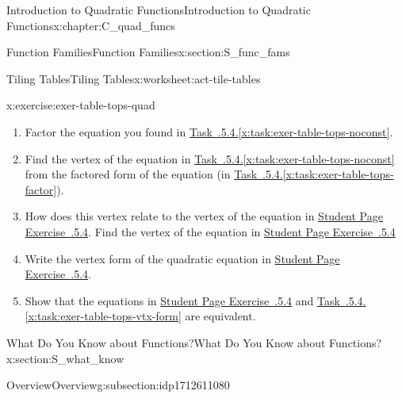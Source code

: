 \documentclass[oneside,10pt,]{book}
\newcommand{\xreffont}{\relax}
\numberwithin{equation}{chapter}
\begin{document}
\begin{chapterptx}{Introduction to Quadratic Functions}{}{Introduction to Quadratic Functions}{}{}{x:chapter:C_quad_funcs}
\begin{sectionptx}{Function Families}{}{Function Families}{}{}{x:section:S_func_fams}
\begin{worksheet-subsection}{Tiling Tables}{}{Tiling Tables}{}{}{x:worksheet:act-tile-tables}
\begin{divisionexercise}{4}{}{}{x:exercise:exer-table-tops-quad}
\begin{enumerate}[font=\bfseries,label=(\alph*),ref=\alph*]
\item\label{x:task:exer-table-tops-factor}Factor the equation you found in \hyperref[x:task:exer-table-tops-noconst]{Task~{\xreffont 4.5.5.4}.{\xreffont\ref{x:task:exer-table-tops-noconst}}}.%
\item{}Find the vertex of the equation in \hyperref[x:task:exer-table-tops-noconst]{Task~{\xreffont 4.5.5.4}.{\xreffont\ref{x:task:exer-table-tops-noconst}}} from the factored form of the equation (in \hyperref[x:task:exer-table-tops-factor]{Task~{\xreffont 4.5.5.4}.{\xreffont\ref{x:task:exer-table-tops-factor}}}).%
\item{}How does this vertex relate to the vertex of the equation in \hyperlink{x:exercise:exer-table-tops-quad}{Student Page Exercise~{\xreffont 4.5.5.4}}. Find the vertex of the equation in \hyperlink{x:exercise:exer-table-tops-quad}{Student Page Exercise~{\xreffont 4.5.5.4}}%
\item\label{x:task:exer-table-tops-vtx-form}Write the vertex form of the quadratic equation in \hyperlink{x:exercise:exer-table-tops-quad}{Student Page Exercise~{\xreffont 4.5.5.4}}.%
\item{}Show that the equations in \hyperlink{x:exercise:exer-table-tops-quad}{Student Page Exercise~{\xreffont 4.5.5.4}} and \hyperref[x:task:exer-table-tops-vtx-form]{Task~{\xreffont 4.5.5.4}.{\xreffont\ref{x:task:exer-table-tops-vtx-form}}} are equivalent.%
\end{enumerate}
\end{divisionexercise}%
\end{worksheet-subsection}
\restoregeometry
\end{sectionptx}
%
%
\typeout{************************************************}
\typeout{************************************************}
%
\begin{sectionptx}{What Do You Know about Functions?}{}{What Do You Know about Functions?}{}{}{x:section:S_what_know}
%
%
\typeout{************************************************}
\typeout{************************************************}
%
\begin{subsectionptx}{Overview}{}{Overview}{}{}{g:subsection:idp1712611080}

\end{subsectionptx}
\end{sectionptx}
\end{chapterptx}
\end{document}
